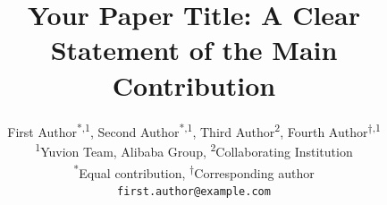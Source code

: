 \title{Your Paper Title: A Clear Statement of the Main Contribution}
\author{First Author\textsuperscript{*,1},
  Second Author\textsuperscript{*,1},
  Third Author\textsuperscript{2},
  Fourth Author\textsuperscript{$\dagger$,1}\\[6pt]
  {\reportaffiliationfont\mdseries\textsuperscript{1}Yuvion Team, Alibaba Group,\quad
   \textsuperscript{2}Collaborating Institution}\\[4pt]
  {\normalfont\textsuperscript{*}Equal contribution,\quad
   \textsuperscript{$\dagger$}Corresponding author}\\[3pt]
  {\normalfont\texttt{first.author@example.com}}}
\newcommand{\shortpapertitle}{Your Paper Title}
\newcommand{\projecturl}{https://example.com/project}
\newcommand{\codeurl}{https://github.com/example/project}
\newcommand{\modelsurl}{https://example.com/models}
\renewcommand{\authorcontributions}{%
  First Author: [research design and methodology];
  Second Author: [implementation and experiments];
  Third Author: [analysis and validation];
  Fourth Author: [supervision and manuscript revision].}
\drafttrue
